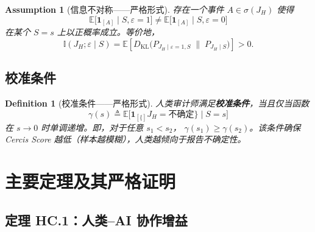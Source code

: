 \documentclass[12pt,a4paper]{article}
\newtheorem{definition}[theorem]{Definition}
\newtheorem{assumption}[theorem]{Assumption}
\newcommand{\E}{\mathbb{E}}
\newcommand{\I}{\mathbb{I}}
\newcommand{\ind}[1]{\mathbf{1}_{[#1]}}
\newcommand{\KL}{D_{\mathrm{KL}}}
\begin{document}
\begin{assumption}[信息不对称——严格形式]
\label{ass:asymmetry-formal}
存在一个事件 $A \in \sigma(J_H)$ 使得
\begin{equation}
    \E\big[\ind{A} \mid S, \varepsilon=1\big] \neq
    \E\big[\ind{A} \mid S, \varepsilon=0\big]
\end{equation}
在某个 $S=s$ 上以正概率成立。等价地，
\begin{equation}
    \I(J_H; \varepsilon \mid S) = \E\left[
        \KL\big( P_{J_H \mid \varepsilon=1, S} \;\|\; P_{J_H \mid S} \big)
    \right] > 0.
\end{equation}
\end{assumption}

\subsection{校准条件}

\begin{definition}[校准条件——严格形式]
\label{def:calibration-formal}
人类审计师满足\textbf{校准条件}，当且仅当函数
\begin{equation}
    \gamma(s) \triangleq \E\big[ \ind\{J_H = \text{不确定}\} \mid S=s \big]
\end{equation}
在 $s \to 0$ 时单调递增。即，对于任意 $s_1 < s_2$，
$\gamma(s_1) \geq \gamma(s_2)$。该条件确保 Cercis Score
越低（样本越模糊），人类越倾向于报告不确定性。
\end{definition}

\section{主要定理及其严格证明}

\subsection{定理 HC.1：人类--AI 协作增益}
\end{document}
